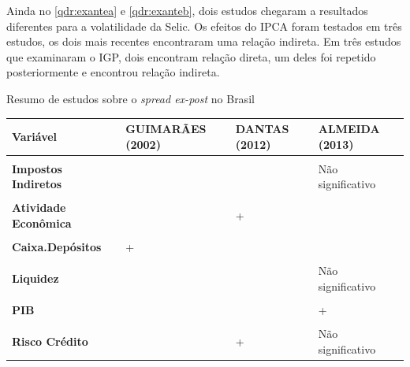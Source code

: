 \documentclass[
  12pt,
  12pt,
  openright,
  oneside,
  a4paper,
  chapter=TITLE,
  section=TITLE,
  subsection=TITLE,
  subsubsection=TITLE,
  portugues,
  sumario=tradicional]{abntex2}
\begin{document}
Ainda no \autoref{qdr:exantea} e \autoref{qdr:exanteb}, dois estudos chegaram a resultados diferentes para a volatilidade da Selic. Os efeitos do IPCA foram testados em três estudos, os dois mais recentes encontraram uma relação indireta. Em três estudos que examinaram o IGP, dois encontram relação direta, um deles foi repetido posteriormente e encontrou relação indireta.

\begin{qdr}
\vspace{20pt}
\caption{Resumo de estudos sobre o \emph{spread ex-post} no Brasil}
\vspace{1mm}
\begingroup\fontsize{10}{12}\selectfont

\begin{tabu} to 
\toprule
Variável & GUIMARÃES (2002) & DANTAS (2012) & ALMEIDA (2013)\\
\midrule
\textbf{} &  &  & \\
\textbf{Impostos Indiretos} &  &  & Não significativo\\
\textbf{} &  &  & \\
\textbf{Atividade Econômica} &  & + & \\
\textbf{} &  &  & \\
\addlinespace
\textbf{Caixa.Depósitos} & + &  & \\
\textbf{} &  &  & \\
\textbf{Liquidez} &  &  & Não significativo\\
\textbf{} &  &  & \\
\textbf{PIB} &  &  & +\\
\addlinespace
\textbf{} &  &  & \\
\textbf{Risco Crédito} &  & + & Não significativo\\
\bottomrule
\end{tabu}
\endgroup{}
\vspace{1mm}
\label{qdr:expost}
\vspace{-2mm}
\end{qdr}
\end{document}
